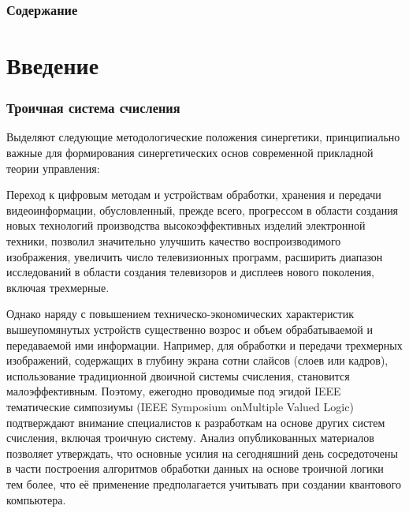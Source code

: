 \documentclass[10pt]{beamer}
\begin{document}

\begin{frame}
  \transdissolve[duration=0.2]
  \frametitle{Содержание}
  \tableofcontents
\end{frame}

\section{Введение}


\begin{frame}[shrink=8]
\transdissolve[duration=0.2] 
\frametitle{Троичная система счисления}
Выделяют следующие методологические положения синергетики, принципиально важные для формирования синергетических основ современной прикладной теории управления:
\begin{block}{}
	Переход к цифровым методам и устройствам обработки, хранения и передачи видеоинформации, обусловленный, прежде всего, прогрессом в области создания новых технологий производства высокоэффективных изделий электронной техники, позволил значительно улучшить качество воспроизводимого изображения, увеличить число телевизионных программ, расширить диапазон исследований в области создания телевизоров и дисплеев нового поколения, включая трехмерные.
	
	Однако наряду с повышением техническо-экономических характеристик вышеупомянутых устройств существенно возрос и объем обрабатываемой и передаваемой ими информации. Например, для обработки и передачи трехмерных изображений, содержащих в глубину экрана сотни слайсов (слоев или кадров), использование традиционной двоичной системы счисления, становится малоэффективным. Поэтому, ежегодно проводимые под эгидой IEEE тематические симпозиумы (IEEE Symposium onMultiple Valued Logic) подтверждают внимание специалистов к разработкам на основе других систем счисления, включая троичную систему. Анализ опубликованных материалов позволяет утверждать, что основные усилия на сегодняшний день сосредоточены в части построения алгоритмов обработки данных на основе троичной логики тем более, что её применение предполагается учитывать при создании квантового компьютера.
\end{block}
\end{frame} 
\end{document}

